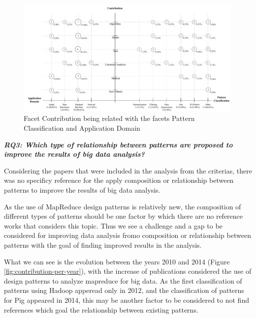 \begin{figure}[hbtp]
\centering
\includegraphics[width=0.99\textwidth]{figs/Contribution-Patterns-Domain.pdf}
\caption{Facet Contribution being related with the facets Pattern
Classification and Application Domain}
\label{fig:contribution-patterns-domain}
\end{figure}

\bigskip
\textbf{\textit{RQ3: Which type of relationship between patterns are proposed to
improve the results of big data analysis?}}
 
Considering the papers that were included in the analysis from the criterias,
there was no specificy reference for the apply composition or relationship
between patterns to improve the results of big data analysis. 


As the use of MapReduce design patterns is relatively new, the
composition of different types of patterns should be one factor by which
there are no reference works that considers this topic.
Thus we see a challenge and a gap to be considered for improving data analysis
fromo composition or  relationship between patterns with the goal of finding
improved results in the analysis.
 
What we can see is the evolution between the years 2010 and 2014 (Figure
\ref{fig:contribution-per-year}), with the increase of publications considered the use of design patterns to analyze
mapreduce for big data. As the first classification of patterns using Hadoop
apperead only in 2012, and the classification of patterns for Pig appeared
in 2014, this may be another factor to be considered to not find references
which goal the relationship between existing patterns.
  
